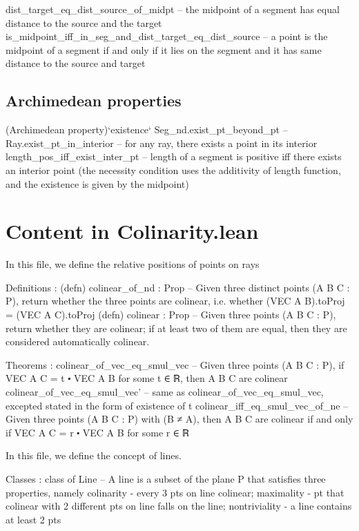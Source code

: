\documentclass[12pt,a4paper]{article}
\begin{document}
    dist_target_eq_dist_source_of_midpt -- the midpoint of a segment has equal distance to the source and the target
    is_midpoint_iff_in_seg_and_dist_target_eq_dist_source -- a point is the midpoint of a segment if and only if it lies on the segment and it has same distance to the source and target

\subsection{Archimedean properties}
  (Archimedean property)`existence`
    Seg_nd.exist_pt_beyond_pt --
    Ray.exist_pt_in_interior -- for any ray, there exists a point in its interior
    length_pos_iff_exist_inter_pt -- length of a segment is positive iff there exists an interior point (the necessity condition uses the additivity of length function, and the existence is given by the midpoint)

\section{Content in Colinarity.lean}

In this file, we define the relative positions of points on rays

  Definitions :
    (defn) colinear_of_nd : Prop -- Given three distinct points (A B C : P), return whether the three points are colinear, i.e. whether (VEC A B).toProj = (VEC A C).toProj
    (defn) colinear : Prop -- Given three points (A B C : P), return whether they are colinear; if at least two of them are equal, then they are considered automatically colinear.
  
  Theorems :
    colinear_of_vec_eq_smul_vec -- Given three points (A B C : P), if VEC A C = t ⬝ VEC A B for some t ∈ ℝ, then A B C are colinear
    colinear_of_vec_eq_smul_vec' -- same as colinear_of_vec_eq_smul_vec, excepted stated in the form of existence of t
    colinear_iff_eq_smul_vec_of_ne -- Given three points (A B C : P) with (B ≠ A), then A B C are colinear if and only if VEC A C = r ⬝ VEC A B for some r ∈ ℝ
    


In this file, we define the concept of lines.

  Classes : 
    class of Line -- A line is a subset of the plane P that satisfies three properties, namely colinarity - every 3 pts on line colinear; maximality - pt that colinear with 2 different pts on line falls on the line; nontriviality - a line contains at least 2 pts
\end{document}
